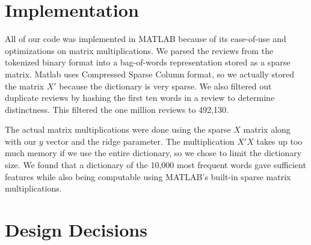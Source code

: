 \documentclass{article}
\begin{document}

\section{Implementation}
All of our code was implemented in MATLAB because of its ease-of-use and optimizations on matrix multiplications. We parsed the reviews from the tokenized binary format into a bag-of-words representation stored as a sparse matrix. Matlab uses Compressed Sparse Column format, so we actually stored the matrix $X'$ because the dictionary is very sparse. We also filtered out duplicate reviews by hashing the first ten words in a review to determine distinctness. This filtered the one million reviews to 492,130.


The actual matrix multiplications were done using the sparse $X$ matrix along with our $y$ vector and the ridge parameter. The multiplication $X'X$ takes up too much memory if we use the entire dictionary, so we chose to limit the dictionary size. We found that a dictionary of the 10,000 most frequent words gave sufficient features while also being computable using MATLAB's built-in sparse matrix multiplications.

\section{Design Decisions}
\end{document}
